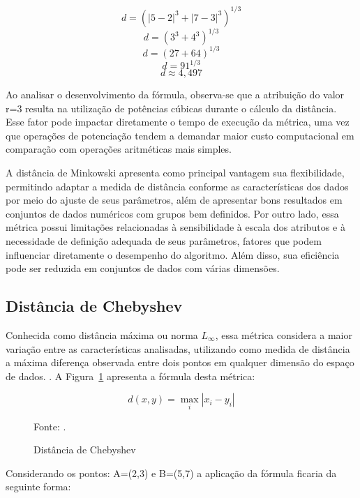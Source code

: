 \documentclass[10pt,a4paper,twocolumn]{article}
\begin{document}
\[
d = \left( |5 - 2|^3 + |7 - 3|^3 \right)^{1/3}
\]
\[
d = \left( 3^3 + 4^3 \right)^{1/3}
\]
\[
d = \left( 27 + 64 \right)^{1/3}
\]
\[
d = 91^{1/3}
\]
\[
d \approx 4,497
\] 

Ao analisar o desenvolvimento da fórmula, observa-se que a atribuição do valor r=3 resulta na utilização de potências cúbicas durante o cálculo da distância. Esse fator pode impactar diretamente o tempo de execução da métrica, uma vez que operações de potenciação tendem a demandar maior custo computacional em comparação com operações aritméticas mais simples.

A distância de Minkowski apresenta como principal vantagem sua flexibilidade, permitindo adaptar a medida de distância conforme as características dos dados por meio do ajuste de seus parâmetros, além de apresentar bons resultados em conjuntos de dados numéricos com grupos bem definidos. Por outro lado, essa métrica possui limitações relacionadas à sensibilidade à escala dos atributos e à necessidade de definição adequada de seus parâmetros, fatores que podem influenciar diretamente o desempenho do algoritmo. Além disso, sua eficiência pode ser reduzida em conjuntos de dados com várias dimensões\cite{VelezFalconi2020}. 



\subsection{Distância de Chebyshev} %
\label{sec:chebyshev}

Conhecida como distância máxima ou norma $L_{\infty}$, essa métrica considera a maior variação entre as características analisadas, utilizando como medida de distância a máxima diferença observada entre dois pontos em qualquer dimensão do espaço de dados. \cite{AlKhamees2026}. A Figura~\ref{fig:chebyshev} apresenta a fórmula desta métrica:

\begin{figure}[H]
    \centering
    \[
        d(x,y) = \max_i \left| x_i - y_i \right|
    \]
    \vspace{0.0cm}
    \caption{Distância de Chebyshev}
    \label{fig:chebyshev}
    {\small Fonte: \cite{AlKhamees2026}.}

    \vspace{0.0cm}
\end{figure}


Considerando os pontos: A=(2,3) e B=(5,7) a aplicação da fórmula ficaria da seguinte forma:
\end{document}

